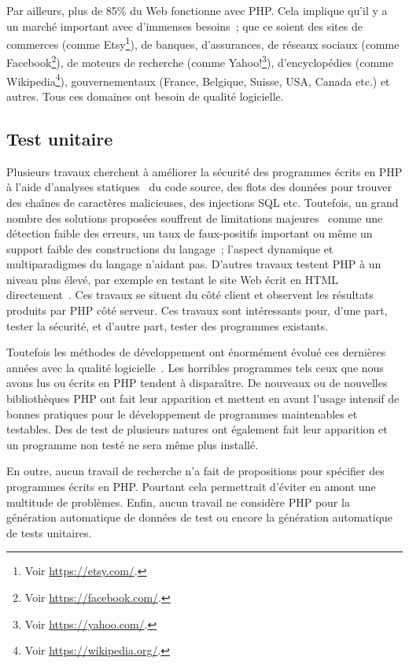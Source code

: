 Par ailleurs, plus de 85\% du Web fonctionne avec PHP. Cela implique qu'il y a
un marché important avec d'immenses besoins~; que ce soient des sites de
commerces (comme Etsy\footnote{Voir \url{https://etsy.com/}.}), de banques,
d'assurances, de réseaux sociaux (comme Facebook\footnote{Voir
\url{https://facebook.com/}.}), de moteurs de recherche (comme
Yahoo!\footnote{Voir \url{https://yahoo.com/}.}), d'encyclopédies (comme
Wikipedia\footnote{Voir \url{https://wikipedia.org/}.}), gouvernementaux
(France, Belgique, Suisse, USA, Canada etc.) et autres. Tous ces domaines ont
besoin de qualité logicielle.

\subsection{Test unitaire}

Plusieurs travaux cherchent à améliorer la sécurité des programmes écrits en PHP
à l'aide d'analyses statiques~ du code source, des flots des données pour trouver des
chaînes de caractères malicieuses, des injections SQL etc. Toutefois, un grand
nombre des solutions proposées souffrent de limitations
majeures~ comme une détection faible des erreurs, un taux de
faux-positifs important ou même un support faible des constructions du langage~;
l'aspect dynamique et multiparadigmes du langage n'aidant pas. D'autres travaux
testent PHP à un niveau plus élevé, par exemple en testant le site Web écrit en
HTML directement~.
Ces travaux se situent du côté client et observent les résultats produits par
PHP côté serveur. Ces travaux sont intéressants pour, d'une part, tester la
sécurité, et d'autre part, tester des programmes existants.

Toutefois les méthodes de développement ont énormément évolué ces dernières
années avec la qualité logicielle~. Les horribles programmes
tels ceux que nous avons lus ou écrits en PHP tendent à disparaître. De nouveaux
 ou de nouvelles bibliothèques PHP ont fait leur
apparition et mettent en avant l'usage intensif de bonnes pratiques pour le
développement de programmes maintenables et testables. Des
 de test de plusieurs natures ont également fait leur
apparition et un programme non testé ne sera même plus installé. 

En outre, aucun travail de recherche n'a fait de propositions pour spécifier des
programmes écrits en PHP. Pourtant cela permettrait d'éviter en amont une
multitude de problèmes. Enfin, aucun travail ne considère PHP pour la génération
automatique de données de test ou encore la génération automatique de tests
unitaires.

